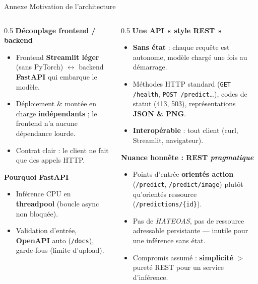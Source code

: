 \documentclass[aspectratio=169,11pt]{beamer}
\newcommand{\emphc}[1]{\textbf{\color{cvblue}#1}}
\newcommand{\code}[1]{\texttt{\small #1}}
\begin{document}
\begin{frame}{Annexe \textbar{} Motivation de l'architecture}
  \begin{columns}[T]
    \begin{column}{0.5\textwidth}
      \textbf{Découplage frontend / backend}
      \begin{itemize}\footnotesize
        \item Frontend \emphc{Streamlit léger} (sans PyTorch) $\leftrightarrow$
          backend \emphc{FastAPI} qui embarque le modèle.
        \item Déploiement \& montée en charge \emphc{indépendants} ;
          le frontend n'a aucune dépendance lourde.
        \item Contrat clair : le client ne fait que des appels HTTP.
      \end{itemize}
      \vspace{0.3em}
      \textbf{Pourquoi \emphc{FastAPI}}
      \begin{itemize}\footnotesize
        \item Inférence CPU en \emphc{threadpool} (boucle async non bloquée).
        \item Validation d'entrée, \emphc{OpenAPI} auto (\code{/docs}),
          garde-fous (limite d'upload).
      \end{itemize}
    \end{column}
    \begin{column}{0.5\textwidth}
      \textbf{Une API \emphc{« style REST »}}
      \begin{itemize}\footnotesize
        \item \emphc{Sans état} : chaque requête est autonome, modèle chargé
          une fois au démarrage.
        \item Méthodes HTTP standard (\code{GET /health}, \code{POST /predict}\dots),
          codes de statut (413, 503), représentations \emphc{JSON \& PNG}.
        \item \emphc{Interopérable} : tout client (curl, Streamlit, navigateur).
      \end{itemize}
      \vspace{0.3em}
      \textbf{Nuance honnête : REST \emph{pragmatique}}
      \begin{itemize}\footnotesize
        \item Points d'entrée \emphc{orientés action} (\code{/predict},
          \code{/predict/image}) plutôt qu'orientés ressource
          (\code{/predictions/\{id\}}).
        \item Pas de \emph{HATEOAS}, pas de ressource adressable persistante
          --- inutile pour une inférence sans état.
        \item Compromis assumé : \emphc{simplicité} $>$ pureté REST pour un
          service d'inférence.
      \end{itemize}
    \end{column}
  \end{columns}
\end{frame}
\end{document}
